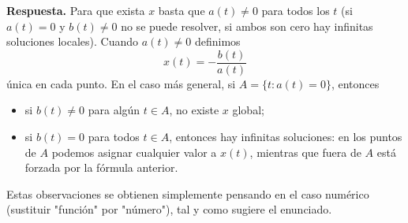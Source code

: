 \begin{enumerate}[label=(\alph*)]
\textbf{Respuesta.} Para que exista $x$ basta que $a(t)\neq0$ para todos los $t$ (si $a(t)=0$ y $b(t)\neq0$ no se puede resolver, si ambos son cero hay infinitas soluciones locales). Cuando $a(t)\neq0$ definimos
$$x(t)=-\frac{b(t)}{a(t)}$$
única en cada punto. En el caso más general, si $A=\{t:a(t)=0\}$, entonces
\begin{itemize}
\item si $b(t)\neq0$ para algún $t\in A$, no existe $x$ global;
\item si $b(t)=0$ para todos $t\in A$, entonces hay infinitas soluciones: en los puntos de $A$ podemos asignar cualquier valor a $x(t)$, mientras que fuera de $A$ está forzada por la fórmula anterior.
\end{itemize}

\end{enumerate}

Estas observaciones se obtienen simplemente pensando en el caso numérico (sustituir "función" por "número"), tal y como sugiere el enunciado.